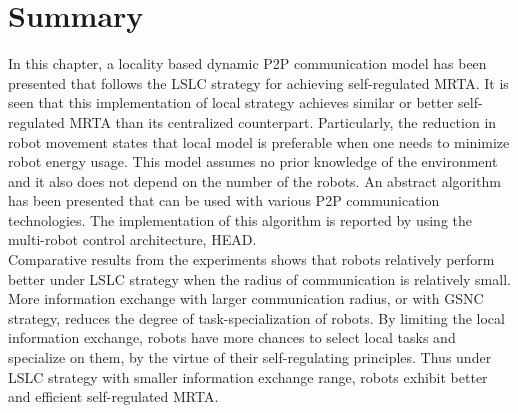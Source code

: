 \section{Summary}
\label{loacl-comm:summary}
In this chapter, a locality based dynamic P2P communication model  has been presented that follows the LSLC strategy for achieving self-regulated MRTA. It is seen that this implementation of local strategy achieves similar or better self-regulated MRTA than its centralized counterpart. Particularly, the reduction in robot movement states that local model is preferable when one needs to minimize robot energy usage. This model assumes no prior knowledge of the environment and it also does not depend on the number of the robots.  An abstract algorithm has been presented that can be used with various P2P communication technologies. The implementation of this algorithm is reported by using the multi-robot control architecture, HEAD.\\
Comparative results from the experiments shows that robots relatively perform better under LSLC strategy when the radius of communication is relatively small. More information exchange with larger communication radius, or with GSNC strategy, reduces the degree of task-specialization of robots. By limiting the local information exchange, robots have more chances to select local tasks and specialize on them, by the virtue of their self-regulating principles. Thus under LSLC strategy with smaller information exchange range, robots exhibit better and efficient self-regulated MRTA.